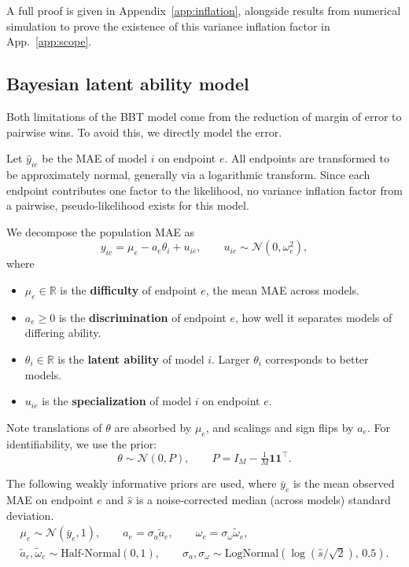 \documentclass{article}
\begin{document}
A full proof is given in Appendix~\ref{app:inflation}, alongside results from numerical simulation to prove the existence of this variance inflation factor in App.~\ref{app:scope}.

\subsection{Bayesian latent ability model}
\label{sec:blam}

Both limitations of the BBT model come from the reduction of margin of error to pairwise wins. To avoid this, we directly model the error.

Let $\hat{y}_{ie}$ be the MAE of model $i$ on endpoint $e$. All endpoints are transformed to be approximately normal, generally via a logarithmic transform. Since each endpoint contributes one factor to the likelihood, no variance inflation factor from a pairwise, pseudo-likelihood exists for this model.

We decompose the population MAE as 
\begin{equation}
    y_{ie} = \mu_e - a_e\theta_i + u_{ie},\qquad u_{ie}\sim\mathcal{N}(0, \omega_e^2),
    \label{eq:decomposition}
\end{equation}
where
\begin{itemize}
    \item $\mu_e \in \mathbb{R}$ is the \textbf{difficulty} of endpoint $e$, the mean MAE across models.
    \item $a_e \geq 0$ is the \textbf{discrimination} of endpoint $e$, how well it separates models of differing ability.
    \item $\theta_i \in \mathbb{R}$ is the \textbf{latent ability} of model $i$. Larger $\theta_i$ corresponds to better models.
    \item $u_{ie}$ is the \textbf{specialization} of model $i$ on endpoint $e$.
\end{itemize}

Note translations of $\theta$ are absorbed by $\mu_e$, and scalings and sign flips by $a_e$. For identifiability, we use the prior: 
\begin{equation}
    \theta \sim \mathcal{N}(0, P), \qquad P = I_M - \tfrac{1}{M}\mathbf{1}\mathbf{1}^\top.
\end{equation}


The following weakly informative priors are used, where $\bar{y}_e$ is the mean observed MAE on endpoint $e$ and $\hat{s}$ is a noise-corrected median (across models) standard deviation.
\begin{gather}
  \mu_e \sim \mathcal{N}(\bar{y}_e, 1), \qquad
  a_e = \sigma_a \tilde{a}_e, \qquad
  \omega_e = \sigma_\omega \tilde{\omega}_e, \nonumber \\
  \tilde{a}_e, \tilde{\omega}_e \sim \text{Half-Normal}(0, 1), \qquad
  \sigma_a, \sigma_\omega \sim \mathrm{LogNormal}\!\left(\log(\hat{s}/\sqrt{2}),\, 0.5\right).
  \label{eq:priors}
\end{gather}
\end{document}
